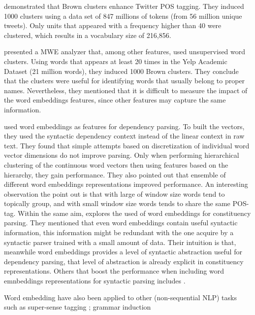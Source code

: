 \documentclass[11pt]{article}
\begin{document}
 demonstrated that Brown clusters enhance Twitter POS tagging. 
They induced 1000 clusters using a data set of 847 millions of tokens (from 56 million unique tweets). Only units that appeared with a frequency higher than 40 were clustered, which results in a vocabulary size of 216,856.

 presented a MWE analyzer that, among other features,  used unsupervised word clusters. 
Using words that appears at least 20 times in the Yelp Academic Dataset (21 million words), they induced 1000 Brown clusters.
They conclude that the clusters were useful for identifying words that usually belong to proper names.
Nevertheless, they mentioned that it is difficult to measure the impact
of the word embeddings features, since other features may capture the same information.

 used word embeddings as features for dependency parsing. To built the vectors, they used the syntactic dependency context instead of the linear context in raw text.
They found that simple attempts based on discretization of individual word vector dimensions do not improve parsing. 
Only when performing hierarchical clustering of the continuous word vectors 
then using features based on the hierarchy, they gain performance. 
They also pointed out that ensemble of different word embeddings representations improved performance.
An interesting observation the point out is that with large of window size words tend to topically group, and with small window size words tends to share the same POS-tag.
Within the same aim, \cite{Andreas:Klein:2014} explores the used of word embeddings for constituency parsing. They mentioned that even word embeddings contain useful syntactic information, this information might be redundant  with the one acquire by a syntactic parser trained with a small amount of data. Their intuition is that, meanwhile word embeddings provides a level of syntactic abstraction useful for dependency parsing, that level of abstraction is already explicit in constituency representations.
Others that boost the performance when including word emnbeddings representations for syntactic parsing includes \cite{Koo:2008,Koo:2010,Haffari:2011,Tratz:2011}.

Word embedding have also been applied to other (non-sequential NLP) tasks
such as super-sense tagging \cite{Grave:2013}; grammar induction \cite{Spitkovsky:2011} 

\end{document}
